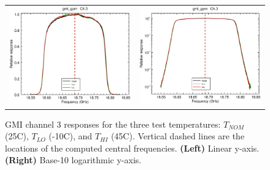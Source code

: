 \begin{figure}[htp]
  \centering
  \begin{tabular}{c c}
    \includegraphics[scale=0.3]{graphics/lin/gmi_gpm-3.eps} &
    \includegraphics[scale=0.3]{graphics/log/gmi_gpm-3.eps}
  \end{tabular}
  \caption{GMI channel 3 responses for the three test temperatures: $T_{NOM}$ (25\textdegree{}C), $T_{LO}$ (-10\textdegree{}C), and $T_{HI}$ (45\textdegree{}C). Vertical dashed lines are the locations of the computed central frequencies. \textbf{(Left)} Linear y-axis. \textbf{(Right)} Base-10 logarithmic y-axis.}
  \label{fig:ch3_response}
\end{figure}

